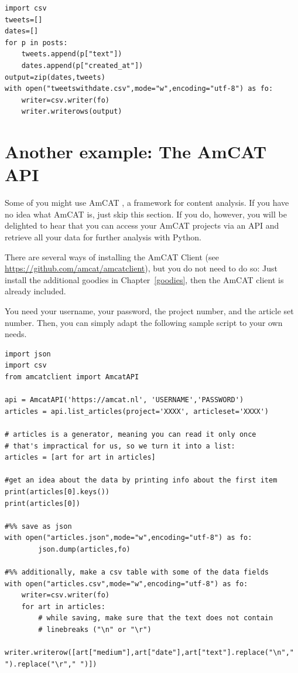 \documentclass[a4paper,12pt]{book}
\begin{document}
\begin{lstlisting}
import csv
tweets=[]
dates=[]
for p in posts:
	tweets.append(p["text"])
	dates.append(p["created_at"])
output=zip(dates,tweets)
with open("tweetswithdate.csv",mode="w",encoding="utf-8") as fo:
	writer=csv.writer(fo)
	writer.writerows(output) 
\end{lstlisting}




\section{Another example: The AmCAT API}
Some of you might use AmCAT \citep{VanAtteveldt2008}, a framework for content analysis. If you have no idea what AmCAT is, just skip this section. If you do, however, you will be delighted to hear that you can access your AmCAT projects via an API and retrieve all your data for further analysis with Python.

There are several ways of installing the AmCAT Client (see \url{https://github.com/amcat/amcatclient}), but you do not need to do so: Just install the additional goodies in Chapter~\ref{goodies}, then the AmCAT client is already included. 

You need your username, your password, the project number, and the article set number. Then, you can simply adapt the following sample script to your own needs.

\begin{lstlisting}
import json
import csv
from amcatclient import AmcatAPI

api = AmcatAPI('https://amcat.nl', 'USERNAME','PASSWORD')
articles = api.list_articles(project='XXXX', articleset='XXXX')

# articles is a generator, meaning you can read it only once
# that's impractical for us, so we turn it into a list:
articles = [art for art in articles]

#get an idea about the data by printing info about the first item
print(articles[0].keys())
print(articles[0])

#%% save as json
with open("articles.json",mode="w",encoding="utf-8") as fo:
        json.dump(articles,fo)
 
#%% additionally, make a csv table with some of the data fields
with open("articles.csv",mode="w",encoding="utf-8") as fo:
    writer=csv.writer(fo)
    for art in articles:
        # while saving, make sure that the text does not contain 
        # linebreaks ("\n" or "\r")
        writer.writerow([art["medium"],art["date"],art["text"].replace("\n"," ").replace("\r"," ")]) 
\end{lstlisting}
\end{document}
